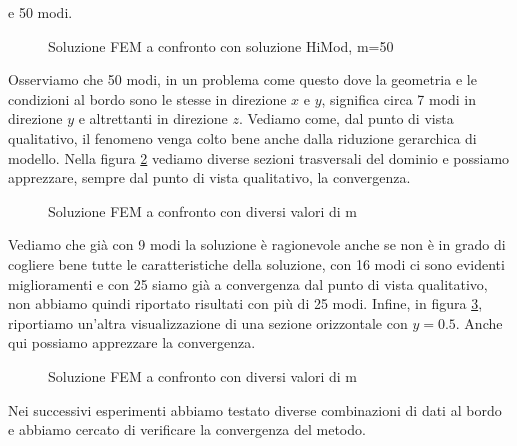 e 50 modi.
\begin{figure}[!h]
\centering
{}
\hspace{20mm}
\caption{Soluzione FEM a confronto con soluzione HiMod, m=50}
\label{fig:confrontocamini}
\end{figure}
Osserviamo che 50 modi, in un problema come questo dove la geometria e le condizioni al bordo sono le stesse in direzione
$x$ e $y$, significa circa 7 modi in direzione $y$ e altrettanti in direzione $z$.
Vediamo come, dal punto di vista qualitativo, il fenomeno venga colto bene anche dalla riduzione gerarchica di modello.
Nella figura \ref{fig:camini2d+} vediamo diverse sezioni trasversali del dominio e possiamo apprezzare, sempre dal punto di vista qualitativo,
la convergenza. 
\begin{figure}[!htbp]
\centering
\subfigure[HiMod, m=9]
{\texttt{[image: Foto2D+/HiMod\_m=9]}}

\subfigure[HiMod, m=16]
{\texttt{[image: Foto2D+/HiMod\_m=16]}}

\subfigure[HiMod, m=25]
{\texttt{[image: Foto2D+/HiMod\_m=25]}}

\caption{Soluzione FEM a confronto con diversi valori di m}
\label{fig:camini2d+}
\end{figure}
Vediamo che gi\`a con 9 modi la soluzione \`e ragionevole anche se non \`e in grado di cogliere 
bene tutte le caratteristiche della soluzione, con 16 modi ci sono evidenti miglioramenti e con 25 siamo gi\`a a convergenza dal punto di 
vista qualitativo, non abbiamo quindi riportato risultati con pi\`u di 25 modi.
Infine, in figura \ref{fig:camini2D}, riportiamo un'altra visualizzazione di una sezione orizzontale con $y=0.5$.
Anche qui possiamo apprezzare la convergenza.
\begin{figure}[!htbp]
\centering
{}



\caption{Soluzione FEM a confronto con diversi valori di m}
\label{fig:camini2D}
\end{figure}
Nei successivi esperimenti abbiamo testato diverse combinazioni di dati al bordo e abbiamo cercato di verificare la convergenza del 
metodo. 
\clearpage
